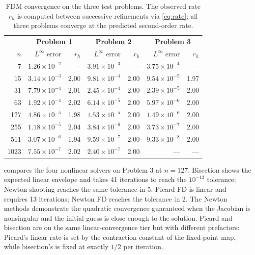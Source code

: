 \documentclass[11pt]{article}
\theoremstyle{plain}
\theoremstyle{remark}
\newcommand{\Linf}{L^\infty}
\begin{document}
\begin{table}[h]
\centering
\small
\begin{tabular}{r|rr|rr|rr}
\toprule
 & \multicolumn{2}{c|}{\textbf{Problem 1}}
 & \multicolumn{2}{c|}{\textbf{Problem 2}}
 & \multicolumn{2}{c}{\textbf{Problem 3}} \\
$n$ & $\Linf$ error & $r_h$ & $\Linf$ error & $r_h$ & $\Linf$ error & $r_h$ \\
\midrule
7    & $1.26 \times 10^{-2}$ & --   & $3.91 \times 10^{-3}$ & --   & $3.75 \times 10^{-4}$ & --   \\
15   & $3.14 \times 10^{-3}$ & 2.00 & $9.81 \times 10^{-4}$ & 2.00 & $9.54 \times 10^{-5}$ & 1.97 \\
31   & $7.79 \times 10^{-4}$ & 2.01 & $2.45 \times 10^{-4}$ & 2.00 & $2.39 \times 10^{-5}$ & 2.00 \\
63   & $1.92 \times 10^{-4}$ & 2.02 & $6.14 \times 10^{-5}$ & 2.00 & $5.97 \times 10^{-6}$ & 2.00 \\
127  & $4.86 \times 10^{-5}$ & 1.98 & $1.53 \times 10^{-5}$ & 2.00 & $1.49 \times 10^{-6}$ & 2.00 \\
255  & $1.18 \times 10^{-5}$ & 2.04 & $3.84 \times 10^{-6}$ & 2.00 & $3.73 \times 10^{-7}$ & 2.00 \\
511  & $3.07 \times 10^{-6}$ & 1.94 & $9.59 \times 10^{-7}$ & 2.00 & $9.33 \times 10^{-8}$ & 2.00 \\
1023 & $7.55 \times 10^{-7}$ & 2.02 & $2.40 \times 10^{-7}$ & 2.00 & ---                    & ---  \\
\bottomrule
\end{tabular}
\caption{FDM convergence on the three test problems. The observed rate
         $r_h$ is computed between successive refinements via
         \cref{eq:rate}; all three problems converge at the predicted
         second-order rate.}
\label{tab:fdm_conv}
\end{table}

 compares the four nonlinear solvers on Problem 3 at
$n = 127$. Bisection shows the expected linear envelope and takes 41
iterations to reach the $10^{-12}$ tolerance; Newton shooting reaches
the same tolerance in 5. Picard FD is linear and requires 13 iterations;
Newton FD reaches the tolerance in 2. The Newton methods demonstrate
the quadratic convergence guaranteed when the Jacobian is nonsingular
and the initial guess is close enough to the solution. Picard and
bisection are on the same linear-convergence tier but with different
prefactors: Picard's linear rate is set by the contraction constant of
the fixed-point map, while bisection's is fixed at exactly $1/2$ per
iteration.
\end{document}
